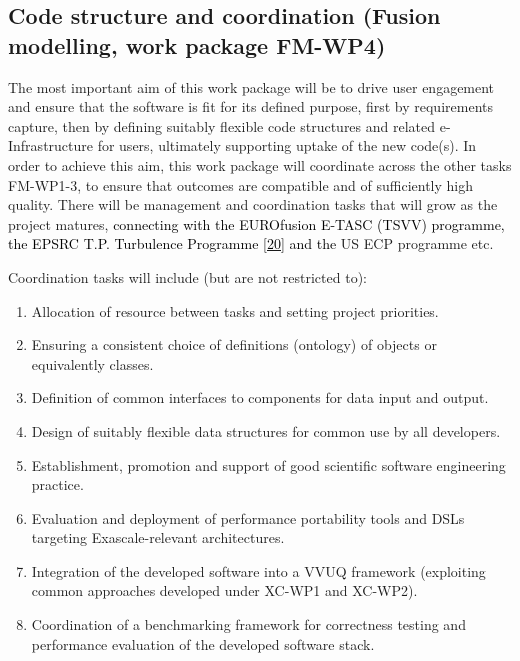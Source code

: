 \documentclass[a4paper]{article}
\newcommand\textstyleInternetlink[1]{\textcolor{blue}{#1}}
\newcommand\liststyleWWNumxii{%
\renewcommand\theenumi{\arabic{enumi}}
\renewcommand\theenumii{\alph{enumii}}
\renewcommand\theenumiii{\roman{enumiii}}
\renewcommand\theenumiv{\arabic{enumiv}}
\renewcommand\labelenumi{\theenumi.}
\renewcommand\labelenumii{\theenumii.}
\renewcommand\labelenumiii{\theenumiii.}
\renewcommand\labelenumiv{\theenumiv.}
}
\begin{document}
\subsection[]{\rmfamily\bfseries }
\subsection[Code structure and coordination (Fusion modelling, work package
FM{}-WP4)]{\textbf{\textcolor[rgb]{0.12156863,0.28627452,0.49019608}{Code structure and coordination
}}\textcolor[rgb]{0.12156863,0.28627452,0.49019608}{(Fusion modelling, work package
}\textbf{\textcolor[rgb]{0.12156863,0.28627452,0.49019608}{FM-WP4}}\textcolor[rgb]{0.12156863,0.28627452,0.49019608}{)}}

\bigskip

The most important aim of this work package will be to drive user engagement and ensure that the software is fit for its
defined purpose, first by requirements capture, then by defining suitably flexible code structures and related
e-Infrastructure for users, ultimately supporting uptake of the new code(s). In order to achieve this aim, this work
package will coordinate across the other tasks FM-WP1-3, to ensure that outcomes are compatible and of sufficiently
high quality. There will be management and coordination tasks that will grow as the project matures,
\textcolor{black}{connecting with the EUROfusion E-TASC (TSVV) programme, the EPSRC T.P. Turbulence Programme
}\href{https://www.york.ac.uk/physics/news/departmentalnews/plasma-fusion/major-grant-award-supports-fusion-energy-research/}{\textstyleInternetlink{\textcolor{black}{[20]}}}\textcolor{black}{
and the }US ECP programme etc.


\bigskip

Coordination tasks will include (but are not restricted to):


\bigskip

\liststyleWWNumxii
\begin{enumerate}
\item Allocation of resource between tasks and setting project priorities.
\item Ensuring a consistent choice of definitions (ontology) of objects or equivalently classes.
\item Definition of common interfaces to components for data input and output. 
\item Design of suitably flexible data structures for common use by all developers.
\item Establishment, promotion and support of good scientific software engineering practice.
\item Evaluation and deployment of performance portability tools and DSLs targeting Exascale-relevant architectures.
\item Integration of the developed software into a VVUQ framework (exploiting common approaches developed under XC-WP1
and XC-WP2).
\item Coordination of a benchmarking framework for correctness testing and performance evaluation of the developed
software stack.
\end{enumerate}
\end{document}
